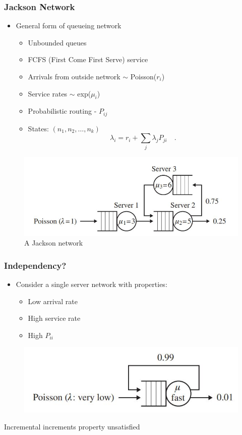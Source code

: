 \documentclass[10pt,notes]{beamer}
\begin{document}
\begin{frame}
    \frametitle{Jackson Network}
    \begin{itemize}
        \item General form of queueing network
        \begin{itemize}
            \item Unbounded queues
            \item FCFS (First Come First Serve) service
            \item Arrivals from outside network \(\sim\) Poisson(\(r_i\))
            \item Service rates \(\sim\) exp(\(\mu_i\))
            \item Probabilistic routing - \(P_{ij}\)
            \item States: \((n_1, n_2, \ldots, n_k)\)
            $$ \lambda_i = r_i + \sum_j \lambda_j P_{ji} \quad \text{.} $$
        
        \end{itemize}
    \end{itemize}
        \begin{figure}
        \includegraphics[width=0.65\linewidth]{images/jackson_network.jpg}
        \caption{A Jackson network}
    \end{figure}
\end{frame}

\begin{frame}
    \frametitle{Independency?}
        \begin{itemize}
            \item Consider a single server network with properties:
            \begin{itemize}
                \item Low arrival rate
                \item High service rate
                \item High \(P_{ii}\)
            \end{itemize}
        \end{itemize}
        \begin{figure}
            \includegraphics[width=0.65\linewidth]{images/independency_network.jpg}
        \end{figure}
        \begin{center} 
            Incremental increments property unsatisfied
        \end{center}

\end{frame}
\end{document}
